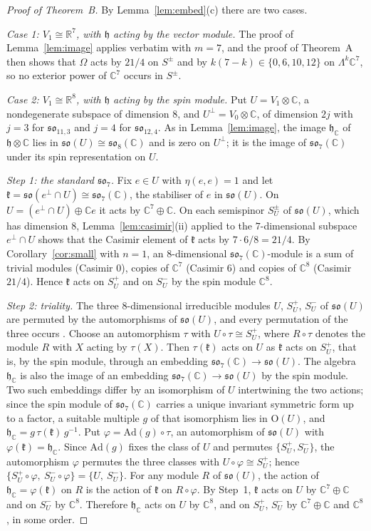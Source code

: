 \documentclass[11pt]{amsart}
\theoremstyle{remark}
\newcommand{\so}{\mathfrak{so}}
\newcommand{\h}{\mathfrak{h}}
\newcommand{\R}{\mathbb{R}}
\newcommand{\C}{\mathbb{C}}
\begin{document}
\begin{proof}[Proof of Theorem~B]
By Lemma~\ref{lem:embed}(c) there are two cases.

\emph{Case 1: $V_1\cong\R^7$, with $\h$ acting by the vector module.} The proof of Lemma~\ref{lem:image} applies verbatim with $m=7$, and the proof of Theorem~A then shows that $\Omega$ acts by $21/4$ on $S^\pm$ and by $k(7-k)\in\{0,6,10,12\}$ on $\Lambda^k\C^7$, so no exterior power of $\C^7$ occurs in $S^\pm$.

\emph{Case 2: $V_1\cong\R^8$, with $\h$ acting by the spin module.} Put $U=V_1\otimes\C$, a nondegenerate subspace of dimension $8$, and $U^\perp=V_0\otimes\C$, of dimension $2j$ with $j=3$ for $\so_{11,3}$ and $j=4$ for $\so_{12,4}$. As in Lemma~\ref{lem:image}, the image $\h_\C$ of $\h\otimes\C$ lies in $\so(U)\cong\so_8(\C)$ and is zero on $U^\perp$; it is the image of $\so_7(\C)$ under its spin representation on $U$.

\emph{Step 1: the standard $\so_7$.} Fix $e\in U$ with $\eta(e,e)=1$ and let $\mathfrak k=\so(e^\perp\cap U)\cong\so_7(\C)$, the stabiliser of $e$ in $\so(U)$. On $U=(e^\perp\cap U)\oplus\C e$ it acts by $\C^7\oplus\C$. On each semispinor $S_U^\pm$ of $\so(U)$, which has dimension $8$, Lemma~\ref{lem:casimir}(ii) applied to the $7$-dimensional subspace $e^\perp\cap U$ shows that the Casimir element of $\mathfrak k$ acts by $7\cdot6/8=21/4$. By Corollary~\ref{cor:small} with $n=1$, an $8$-dimensional $\so_7(\C)$-module is a sum of trivial modules (Casimir $0$), copies of $\C^7$ (Casimir $6$) and copies of $\C^8$ (Casimir $21/4$). Hence $\mathfrak k$ acts on $S_U^+$ and on $S_U^-$ by the spin module $\C^8$.

\emph{Step 2: triality.} The three $8$-dimensional irreducible modules $U$, $S_U^+$, $S_U^-$ of $\so(U)$ are permuted by the automorphisms of $\so(U)$, and every permutation of the three occurs \cite[\S 20.3]{FH91}. Choose an automorphism $\tau$ with $U\circ\tau\cong S_U^+$, where $R\circ\tau$ denotes the module $R$ with $X$ acting by $\tau(X)$. Then $\tau(\mathfrak k)$ acts on $U$ as $\mathfrak k$ acts on $S_U^+$, that is, by the spin module, through an embedding $\so_7(\C)\to\so(U)$. The algebra $\h_\C$ is also the image of an embedding $\so_7(\C)\to\so(U)$ by the spin module. Two such embeddings differ by an isomorphism of $U$ intertwining the two actions; since the spin module of $\so_7(\C)$ carries a unique invariant symmetric form up to a factor, a suitable multiple $g$ of that isomorphism lies in $\mathrm O(U)$, and $\h_\C=g\,\tau(\mathfrak k)\,g^{-1}$. Put $\varphi=\mathrm{Ad}(g)\circ\tau$, an automorphism of $\so(U)$ with $\varphi(\mathfrak k)=\h_\C$. Since $\mathrm{Ad}(g)$ fixes the class of $U$ and permutes $\{S_U^+,S_U^-\}$, the automorphism $\varphi$ permutes the three classes with $U\circ\varphi\cong S_U^+$; hence $\{S_U^+\circ\varphi,\ S_U^-\circ\varphi\}=\{U,\ S_U^-\}$. For any module $R$ of $\so(U)$, the action of $\h_\C=\varphi(\mathfrak k)$ on $R$ is the action of $\mathfrak k$ on $R\circ\varphi$. By Step~1, $\mathfrak k$ acts on $U$ by $\C^7\oplus\C$ and on $S_U^-$ by $\C^8$. Therefore $\h_\C$ acts on $U$ by $\C^8$, and on $S_U^+$, $S_U^-$ by $\C^7\oplus\C$ and $\C^8$, in some order.


\end{proof}
\end{document}
